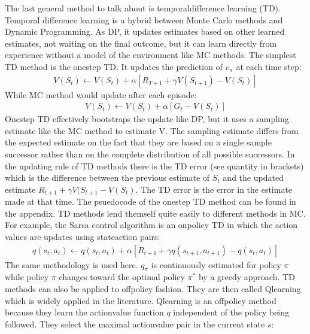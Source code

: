 \documentclass[letterpaper,10pt,english]{jupyterBook}
\begin{document}
\sphinxAtStartPar
The last general method to talk about is temporal\sphinxhyphen{}difference learning (TD). Temporal difference learning is a hybrid between Monte Carlo methods and Dynamic Programming. As DP, it updates estimates based on other learned estimates, not waiting on the final outcome, but it can learn directly from experience without a model of the environment like MC methods. The simplest TD method is the one\sphinxhyphen{}step TD. It updates the prediction of \(v_{\pi}\) at each time step:
\begin{equation*}
\begin{split}V(S_t) \leftarrow V(S_t) + \alpha[R_{T+1} + \gamma V(S_{t+1}) - V(S_t)]\end{split}
\end{equation*}
\sphinxAtStartPar
While MC method would update after each episode:
\begin{equation*}
\begin{split} V(S_t) \leftarrow V(S_t) + \alpha[G_t - V(S_t)] \end{split}
\end{equation*}
\sphinxAtStartPar
One\sphinxhyphen{}step TD effectively bootstraps the update like DP, but it uses a sampling estimate like the MC method to estimate V. The sampling estimate differs from the expected estimate on the fact that they are based on a single sample successor rather than on the complete distribution of all possible successors. In the updating rule of TD methods there is the TD error (see quantity in brackets) which is the difference between the previous estimate of \(S_t\) and the updated estimate  \(R_{t+1} + \gamma V(S_{t+1} - V(S_t)\). The TD error is the error in the estimate made at that time. The psuedocode of the one\sphinxhyphen{}step TD method can be found in the appendix. TD methods lend themself quite easily to different methods in MC. For example, the Sarsa control algorithm is an on\sphinxhyphen{}policy TD in which the action values are updates using state\sphinxhyphen{}action pairs:
\begin{equation*}
\begin{split} q(s_t, a_t) \leftarrow q(s_t, a_t) + \alpha[R_{t+1} + \gamma q(s_{t+1}, a_{t+1}) - q(s_t, a_t)] \end{split}
\end{equation*}
\sphinxAtStartPar
The same methodology is used here. \(q_\pi\) is continuously estimated for policy \(\pi\) while policy \(\pi\) changes toward the optimal policy \(\pi^*\) by a greedy approach. TD methods can also be applied to off\sphinxhyphen{}policy fashion. They are then called Q\sphinxhyphen{}learning which is widely applied in the literature. Q\sphinxhyphen{}learning is an off\sphinxhyphen{}policy method because they learn the action\sphinxhyphen{}value function \(q\) independent of the policy being followed. They select the maximal action\sphinxhyphen{}value pair in the current state \(s\):
\end{document}
